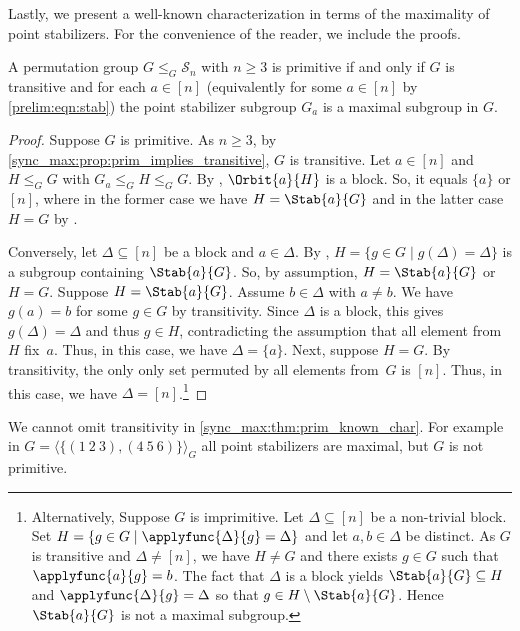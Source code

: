 Lastly, we present a well-known characterization in terms of the maximality of point stabilizers.
For the convenience of the reader, we include the proofs.

\begin{theorem}
	\label{sync_max:thm:prim_known_char}
	A permutation group $G \le_G \mathcal S_n$
	with $n \ge 3$ is primitive
	if and only if $G$ is transitive and for each $a \in [n]$ (equivalently for some $a \in [n]$ by \cref{prelim:eqn:stab}) the point stabilizer subgroup $G_a$ 
	is a maximal subgroup in $G$. 
\end{theorem}
\begin{proof}
Suppose $G$ is primitive.
As $n \ge 3$, by \cref{sync_max:prop:prim_implies_transitive}, $G$ is transitive.
Let $a \in [n]$ and $H \le_G G$ with $G_a \le_G H \le_G G$. 
By ,
$\Orbit{a}{H}$ is a block.
So, it equals $\{a\}$ or $[n]$, where in the former
case we have $H = \Stab{a}{G}$
and in the latter case $H = G$
by .

Conversely, let $\Delta \subseteq [n]$ be a block and $a \in \Delta$.
By ,
$H = \{ g \in G \mid g(\Delta) = \Delta \}$
is a subgroup containing $\Stab{a}{G}$.
So, by assumption, $H = \Stab{a}{G}$
or $H = G$. Suppose $H = \Stab{a}{G}$. Assume $b \in \Delta$ with $a \ne b$. 
We have $g(a) = b$ for some $g \in G$ by transitivity.
Since $\Delta$ is a block, this gives $g(\Delta) = \Delta$
and thus $g \in H$, contradicting the assumption that
all element from~$H$ fix~$a$.
Thus, in this case, we have  $\Delta = \{a\}$.
Next, suppose $H = G$.
By transitivity, the only only set permuted by all elements from~$G$
is $[n]$. Thus, in this case, we have $\Delta = [n]$.\footnote{Alternatively,
	Suppose $G$ is imprimitive. Let $\Delta \subseteq [n]$ 
	be a non-trivial block.
	Set $H = \{ g \in G \mid \applyfunc{\Delta}{g} = \Delta \}$
	and let $a,b \in \Delta$ be distinct.	
	As $G$ is transitive and $\Delta \ne [n]$,
	we have $H \ne G$ and there exists $g \in G$ such
	that $\applyfunc{a}{g} = b$.
	The fact that $\Delta$ is a block yields $\Stab{a}{G} \subseteq H$ and $\applyfunc{\Delta}{g} = \Delta$
	so that $g \in H \setminus \Stab{a}{G}$. Hence $\Stab{a}{G}$
	is not a maximal subgroup.}
\end{proof}

We cannot omit transitivity in \cref{sync_max:thm:prim_known_char}.
For example in $G = \langle \{ (1 ~ 2 ~ 3), (4 ~ 5 ~ 6) \} \rangle_G$ 
all point stabilizers are maximal, but $G$ is not primitive.
